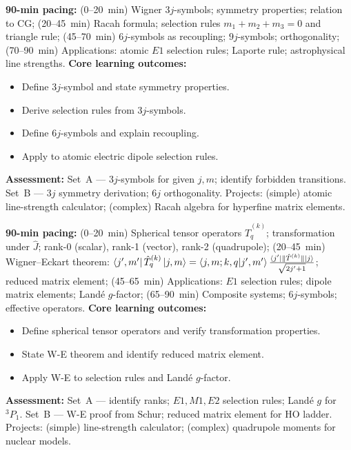 \documentclass[11pt,a4paper]{article}
\begin{document}
\medskip

\begin{tcolorbox}[modulebox, title={Module~II.3 --- Lecture L06: Wigner $3j$-Symbols and Racah Algebra}]
\textbf{90-min pacing:} (0--20~min) Wigner $3j$-symbols; symmetry properties; relation to CG; (20--45~min) Racah formula; selection rules $m_1+m_2+m_3=0$ and triangle rule; (45--70~min) $6j$-symbols as recoupling; $9j$-symbols; orthogonality; (70--90~min) Applications: atomic $E1$ selection rules; Laporte rule; astrophysical line strengths.
\medskip\textbf{Core learning outcomes:}
\begin{itemize}[leftmargin=1.4em,topsep=2pt,itemsep=1pt]
  \item Define $3j$-symbol and state symmetry properties.
  \item Derive selection rules from $3j$-symbols.
  \item Define $6j$-symbols and explain recoupling.
  \item Apply to atomic electric dipole selection rules.
\end{itemize}
\medskip\textbf{Assessment:}
Set~A --- $3j$-symbols for given $j,m$; identify forbidden transitions.
Set~B --- $3j$ symmetry derivation; $6j$ orthogonality.
Projects: (simple) atomic line-strength calculator; (complex) Racah algebra for hyperfine matrix elements.
\end{tcolorbox}

\medskip

\begin{tcolorbox}[modulebox, title={Module~II.3 --- Lecture L07: The Wigner--Eckart Theorem}]
\textbf{90-min pacing:} (0--20~min) Spherical tensor operators $\hat{T}^{(k)}_q$; transformation under $\hat{J}$; rank-0 (scalar), rank-1 (vector), rank-2 (quadrupole); (20--45~min) Wigner--Eckart theorem: $\bra{j',m'}\hat{T}^{(k)}_q\ket{j,m}=\braket{j,m;k,q|j',m'}\tfrac{\bra{j'}\|\hat{T}^{(k)}\|\ket{j}}{\sqrt{2j'+1}}$; reduced matrix element; (45--65~min) Applications: $E1$ selection rules; dipole matrix elements; Land\'e $g$-factor; (65--90~min) Composite systems; $6j$-symbols; effective operators.
\medskip\textbf{Core learning outcomes:}
\begin{itemize}[leftmargin=1.4em,topsep=2pt,itemsep=1pt]
  \item Define spherical tensor operators and verify transformation properties.
  \item State W-E theorem and identify reduced matrix element.
  \item Apply W-E to selection rules and Land\'e $g$-factor.
\end{itemize}
\medskip\textbf{Assessment:}
Set~A --- identify ranks; $E1,M1,E2$ selection rules; Land\'e $g$ for $^3P_1$.
Set~B --- W-E proof from Schur; reduced matrix element for HO ladder.
Projects: (simple) line-strength calculator; (complex) quadrupole moments for nuclear models.
\end{tcolorbox}
\end{document}
